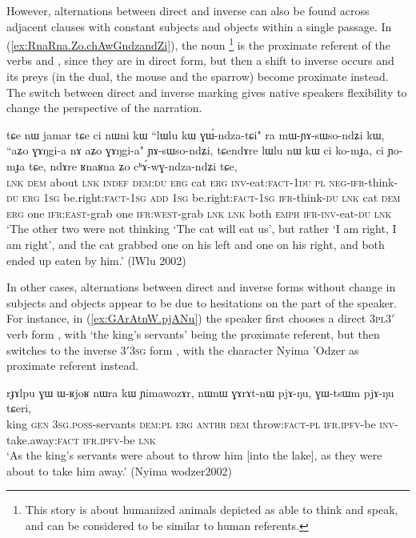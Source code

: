 However, alternations between direct and inverse can also be found across adjacent clauses with constant subjects and objects within a single passage. In (\ref{ex:RnaRna.Zo.chAwGndzandZi}), the noun \footnote{This story is about humanized animals depicted as able to think and speak, and can be considered to be similar to human referents. } is the  proximate referent of the verbs  and , since they are in direct form, but then a shift to inverse occurs and its preys (in the dual, the mouse and the sparrow) become proximate instead. The switch between direct and inverse marking gives native speakers flexibility to change the perspective of the narration.
\largerpage
\begin{exe}
\ex \label{ex:RnaRna.Zo.chAwGndzandZi}
\gll tɕe nɯ jamar tɕe ci nɯni kɯ ``lɯlu kɯ ɣɯ́-ndza-tɕi" ra mɯ-ɲɤ-sɯso-ndʑi kɯ, ``aʑo ɣɤŋgi-a nɤ aʑo ɣɤŋgi-a" ɲɤ-sɯso-ndʑi, tɕendɤre lɯlu nɯ kɯ ci ko-mɟa, ci ɲo-mɟa tɕe, ndɤre ʁnaʁna ʑo cʰɤ́-wɣ-ndza-ndʑi tɕe, \\
\textsc{lnk} \textsc{dem} about \textsc{lnk} \textsc{indef} \textsc{dem}:\textsc{du} \textsc{erg} cat \textsc{erg} \textsc{inv}-eat:\textsc{fact}-\textsc{1du} \textsc{pl} \textsc{neg}-\textsc{ifr}-think-\textsc{du} \textsc{erg} \textsc{1sg} be.right:\textsc{fact}-\textsc{1sg} \textsc{add} \textsc{1sg} be.right:\textsc{fact}-\textsc{1sg} \textsc{ifr}-think-\textsc{du} \textsc{lnk} cat \textsc{dem} \textsc{erg} one \textsc{ifr}:\textsc{east}-grab one \textsc{ifr}:\textsc{west}-grab \textsc{lnk} \textsc{lnk} both \textsc{emph} \textsc{ifr}-\textsc{inv}-eat-\textsc{du} \textsc{lnk} \\
\glt `The other two were not thinking `The cat will eat us', but rather `I am right, I am right', and the cat grabbed one on his left and one on his right, and both ended up eaten by him.' (lWlu 2002)
\end{exe} 

In other cases, alternations between direct and inverse forms without change in subjects and objects appear to be due to hesitations on the part of the speaker. For instance, in (\ref{ex:GArAtnW.pjANu}) the speaker first chooses a direct \textsc{3pl}\fl{}3$'$ verb form , with  `the king's servants' being the proximate referent, but then switches to the inverse 3$'$\fl{}\textsc{3sg} form , with the character Nyima 'Odzer as proximate referent instead.

\begin{exe}
\ex \label{ex:GArAtnW.pjANu}
\gll  rɟɤlpu ɣɯ ɯ-ʁjoʁ nɯra kɯ ɲimawozɤr, nɯnɯ ɣɤrɤt-nɯ pjɤ-ŋu, ɣɯ-tsɯm pjɤ-ŋu tɕeri, \\
king \textsc{gen} \textsc{3sg}.\textsc{poss}-servants \textsc{dem}:\textsc{pl} \textsc{erg}  \textsc{anthr} \textsc{dem} throw:\textsc{fact}-\textsc{pl} \textsc{ifr}.\textsc{ipfv}-be \textsc{inv}-take.away:\textsc{fact} \textsc{ifr}.\textsc{ipfv}-be \textsc{lnk} \\
\glt `As the king's servants were about to throw him [into the lake], as they were about to take him away.' (Nyima wodzer2002)
\end{exe}

